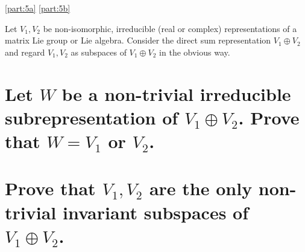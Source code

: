 \documentclass[
	pages,
	boxes,
	color=WildStrawberry
]{homework}
\begin{document}
\begin{solution}
	\ref{part:5a}
	\ref{part:5b}
\end{solution}

\begin{problem}
Let $V_1, V_2$ be non-isomorphic, irreducible (real or complex) representations of a matrix Lie group or Lie algebra. Consider the direct sum representation $V_1 \oplus V_2$ and regard $V_1, V_2$ as subspaces of $V_1 \oplus V_2$ in the obvious way.
\begin{parts}
	\part{Let $W$ be a non-trivial irreducible subrepresentation of $V_1 \oplus V_2$. Prove that $W = V_1$ or $V_2$.}
	\part{Prove that $V_1, V_2$ are the only non-trivial invariant subspaces of $V_1 \oplus V_2$.}
\end{parts}
\end{problem}
\end{document}
